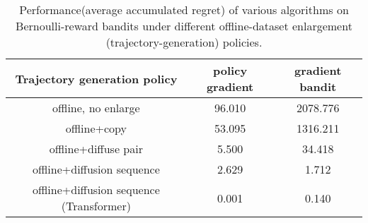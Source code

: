 \begin{table}[htbp]
    \centering
    \begin{tabular}{c c c}
    \toprule
    Trajectory generation policy & policy gradient & gradient bandit \\
    \midrule
    offline, no enlarge & 96.010 & 2078.776 \\
    offline+copy & 53.095 & 1316.211 \\
    offline+diffuse pair & 5.500 & 34.418 \\
    offline+diffusion sequence & 2.629 & 1.712 \\
    offline+diffusion sequence (Transformer) & 0.001 & 0.140 \\
    \bottomrule
\end{tabular}
\caption{Performance(average accumulated regret) of various algorithms on Bernoulli-reward bandits under different offline-dataset enlargement (trajectory-generation) policies.}
\label{table:compare_gradient_bandit}
\end{table}
